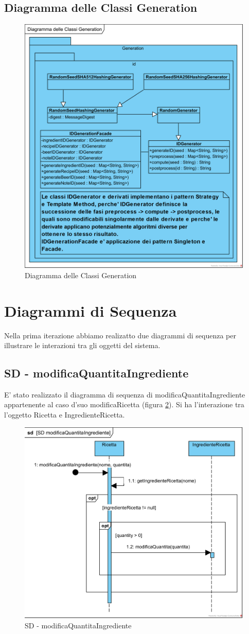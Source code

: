 \documentclass[a4paper,12pt]{report}
\begin{document}
		\subsection{Diagramma delle Classi Generation}
			\begin{figure}[!h]
				\centering
				\includegraphics[width=0.5\linewidth]{image/Diagramma-delle-Classi-Generation.png}
				\caption{Diagramma delle Classi Generation}\label{fig:1}
			\end{figure}  
			
    \newpage
      	\section{Diagrammi di Sequenza} 
	Nella prima iterazione abbiamo realizatto due diagrammi di sequenza per illustrare le interazioni tra gli oggetti del sistema.
		\subsection{SD - modificaQuantitaIngrediente}
			E' stato realizzato il diagramma di sequenza di modificaQuantitaIngrediente appartenente al caso d'suo modificaRicetta (figura \ref{fig:SD-modificaQuantitaIngrediente}).
			Si ha l'interazione tra l'oggetto Ricetta e IngredienteRicetta.
			\begin{figure}[!h]
				\centering
				\includegraphics[width=0.7\linewidth]{image/SD-modificaQuantitaIngrediente.png}
				\caption{SD - modificaQuantitaIngrediente}\label{fig:SD-modificaQuantitaIngrediente}
			\end{figure}	
		\newpage	
\end{document}
